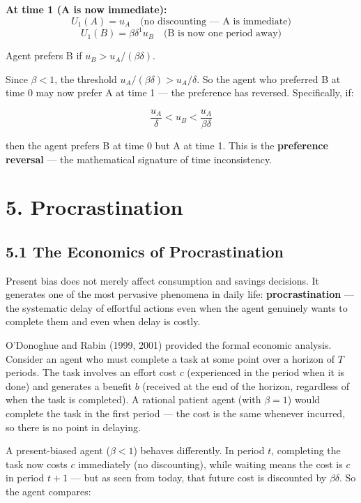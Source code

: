 \documentclass[12pt, letterpaper]{article}
\begin{document}
\textbf{At time 1 (A is now immediate):} $$U_1(A) = u_A \quad \text{(no discounting --- A is immediate)}$$ $$U_1(B) = \beta \delta^1 u_B \quad \text{(B is now one period away)}$$

Agent prefers B if $u_B > u_A / (\beta \delta)$.

Since $\beta < 1$, the threshold $u_A / (\beta \delta) > u_A / \delta$. So the agent who preferred B at time 0 may now prefer A at time 1 --- the preference has reversed. Specifically, if:

$$\frac{u_A}{\delta} < u_B < \frac{u_A}{\beta \delta}$$

then the agent prefers B at time 0 but A at time 1. This is the \textbf{preference reversal} --- the mathematical signature of time inconsistency.

\medskip


\section{5. Procrastination}



\subsection{5.1 The Economics of Procrastination}


Present bias does not merely affect consumption and savings decisions. It generates one of the most pervasive phenomena in daily life: \textbf{procrastination} --- the systematic delay of effortful actions even when the agent genuinely wants to complete them and even when delay is costly.

O'Donoghue and Rabin (1999, 2001) provided the formal economic analysis. Consider an agent who must complete a task at some point over a horizon of $T$ periods. The task involves an effort cost $c$ (experienced in the period when it is done) and generates a benefit $b$ (received at the end of the horizon, regardless of when the task is completed). A rational patient agent (with $\beta = 1$) would complete the task in the first period --- the cost is the same whenever incurred, so there is no point in delaying.

A present-biased agent ($\beta < 1$) behaves differently. In period $t$, completing the task now costs $c$ immediately (no discounting), while waiting means the cost is $c$ in period $t+1$ --- but as seen from today, that future cost is discounted by $\beta\delta$. So the agent compares:
\end{document}
